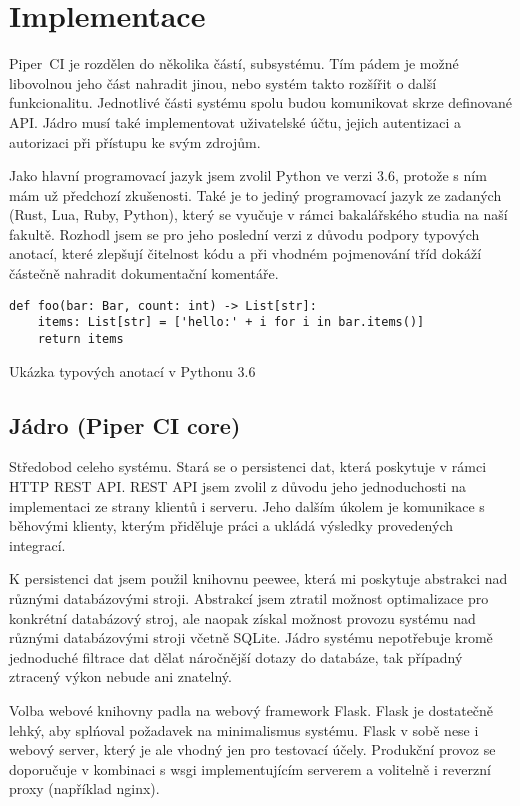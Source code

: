 \chapter{Implementace}

Piper~CI je rozdělen do několika částí, subsystému.
Tím pádem je možné libovolnou jeho část nahradit jinou, nebo systém takto rozšířit o další funkcionalitu.
Jednotlivé části systému spolu budou komunikovat skrze definované API.
Jádro musí také implementovat uživatelské účtu, jejich autentizaci a autorizaci při přístupu ke svým zdrojům.

Jako hlavní programovací jazyk jsem zvolil Python ve verzi 3.6, protože s ním mám už předchozí zkušenosti.
Také je to jediný programovací jazyk ze zadaných (Rust, Lua, Ruby, Python), který se vyučuje v rámci bakalářského studia na naší fakultě.
Rozhodl jsem se pro jeho poslední verzi z důvodu podpory typových anotací, které zlepšují čitelnost kódu a při vhodném pojmenování tříd dokáží částečně nahradit dokumentační komentáře.

\begin{listing}[ht]
\begin{verbatim}
def foo(bar: Bar, count: int) -> List[str]:
    items: List[str] = ['hello:' + i for i in bar.items()]
    return items
\end{verbatim}
\caption{Ukázka typových anotací v Pythonu 3.6}
\end{listing}

\section{Jádro (Piper CI core)}

Středobod celeho systému.
Stará se o persistenci dat, která poskytuje v rámci HTTP REST API.
REST API jsem zvolil z důvodu jeho jednoduchosti na implementaci ze strany klientů i serveru.
Jeho dalším úkolem je komunikace s běhovými klienty, kterým přiděluje práci a ukládá výsledky provedených integrací.

K persistenci dat jsem použil knihovnu peewee, která mi poskytuje abstrakci nad různými databázovými stroji.
Abstrakcí jsem ztratil možnost optimalizace pro konkrétní databázový stroj, ale naopak získal možnost provozu systému nad různými databázovými stroji včetně SQLite.
Jádro systému nepotřebuje kromě jednoduché filtrace dat dělat náročnější dotazy do databáze, tak případný ztracený výkon nebude ani znatelný.

Volba webové knihovny padla na webový framework Flask.
Flask je dostatečně lehký, aby splńoval požadavek na minimalismus systému.
Flask v sobě nese i webový server, který je ale vhodný jen pro testovací účely.
Produkční provoz se doporučuje v kombinaci s wsgi implementujícím serverem a volitelně i reverzní proxy (například nginx).

